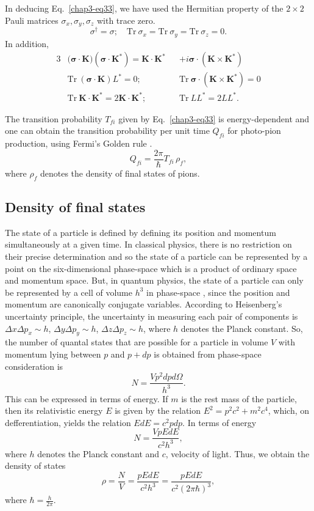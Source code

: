 In deducing Eq.\ \eqref{chap3-eq33}, we have used the Hermitian property of the $2 \times 2$ Pauli matrices $\sigma_x, \sigma_y, \sigma_z$ with trace zero.
$$
\sigma^\dagger = \sigma; \quad \text{Tr}~ \sigma_x = \text{Tr}~ \sigma_y = \text{Tr}~ \sigma_z =0.
$$
In addition,
\begin{alignat*}{3}
  &(\boldsymbol{\sigma \cdot K)(\sigma \cdot K^\ast)} = \boldsymbol{K \cdot K^\ast} && +  i\boldsymbol{\sigma\cdot(K \times K^\ast)}\\
  & \text{Tr}~  (\boldsymbol{\sigma \cdot K})L^\ast =0; && \text{Tr}~ \boldsymbol{\sigma \cdot (K \times K^\ast)}=0\\
  & \text{Tr}~ \boldsymbol{K \cdot K^\ast} = 2 \boldsymbol{K \cdot K^\ast}; & &\text{Tr}~LL^\ast = 2LL^\ast.
\end{alignat*}

The transition probability $T_{fi}$ given by Eq.\ \eqref{chap3-eq33} is energy-dependent and one can obtain the transition probability per unit time $Q_{fi}$ for photo-pion production, using Fermi's Golden rule \cite{chap3-key23}.
\begin{equation}
  Q_{fi}= \frac{2 \pi}{\hbar} T_{fi}\, {\rho_f}, \label{chap3-eq34}
\end{equation}
where $\rho_f$ denotes the density of final states of pions.

\subsection{Density of final states}\label{chap3-sec4.1}

The state of a particle is defined by defining its position and momentum simultaneously at a given time. In classical physics, there is no restriction on their precise determination and so the state of a particle can be represented by a point on the six-dimensional phase-space which is a product of ordinary space and momentum space. But, in quantum physics, the state of a particle can only be represented by a cell of volume $h^3$ in phase-space \cite{chap3-key24}, since the position and momentum are canonically conjugate variables. According to Heisenberg's uncertainty principle, the uncertainty in measuring each pair of components is $\Delta x \Delta p_x \sim h$, $\Delta y \Delta p_y \sim h$, $\Delta z \Delta p_z \sim h$, where $h$ denotes the Planck constant. So, the number of quantal states that are possible for a particle in volume $V$ with momentum lying between $p$ and $p + dp$ is obtained from phase-space consideration \cite{chap3-key24} is
$$
N = \frac{Vp^2 dpd\Omega}{h^3}.
$$
This can be expressed in terms of energy. If $m$ is the rest mass of the particle, then its relativistic energy $E$ is given by the relation $E^2= p^2 c^2+ m^2 c^4$, which, on defferentiation, yields the relation $EdE=c^2pdp$. In terms of energy
$$
N= \frac{Vp{EdE}}{c^2 h^3},
$$
where $h$ denotes the Planck constant and $c$, velocity of light. Thus, we obtain the density of states
$$
\rho = \frac{N}{V} = \frac{p{EdE}}{c^2 h^3} = \frac{p{EdE}}{c^2 (2\pi \hbar)^3},
$$
where $\hbar = \tfrac{h}{2\pi}$.

